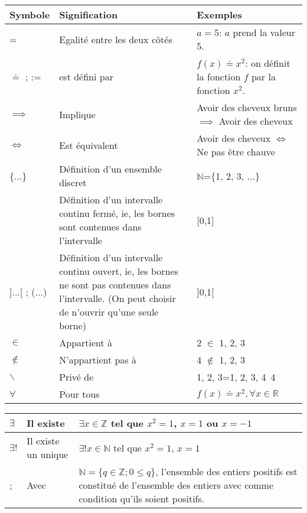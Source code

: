 \documentclass[a4paper, 12pt, french, twoside]{article}
\newcommand{\Nn}{{\mathbb{N}}}
\newcommand{\Zz}{{\mathbb{Z}}}
\newcommand{\Rr}{{\mathbb{R}}}
\begin{document}
\begin{center}
\begin{tabular}{|m{1.5cm} |m{8cm}| m{6.5cm}|} 
 \hline
 Symbole & Signification & Exemples\\ [0.5ex] 
 \hline
 = & Egalité entre les deux côtés & $a=5$: $a$ prend la valeur 5.  \\ 
 \hline
 $\doteq$ ; := & est défini par & $f(x)\doteq x^2$: on définit la fonction $f$ par la fonction $x^2$.  \\
 \hline
 $\implies$ & Implique & Avoir des cheveux bruns $\implies$ Avoir des cheveux \\
 \hline
 $\iff$ & Est équivalent & Avoir des cheveux $\iff$ Ne pas être chauve\\
 \hline
 \{...\} & Définition d'un ensemble discret & $\Nn$=\{1, 2, 3, ...\}  \\
 \hline
 [...] & Définition d'un intervalle continu fermé, ie, les bornes sont contenues dans l'intervalle & [0,1]  \\
 \hline
 ]...[ ; (...)& Définition d'un intervalle continu ouvert, ie, les bornes ne sont pas contenues dans l'intervalle. (On peut choisir de n'ouvrir qu'une seule borne) & ]0,1[  \\
 \hline
  $\in$ & Appartient à & 2 $\in$ {1, 2, 3} \\
 \hline
 $\notin$ & N'appartient pas à & 4 $\notin$ {1, 2, 3} \\
 \hline
 
 $\backslash$ & Privé de & {1, 2, 3}={1, 2, 3, 4}\ {4} \\
 \hline
 $\forall $ & Pour tous & $f(x)\doteq x^2, \forall x\in \Rr$\\
 \hline
 \end{tabular}
 \end{center}
 \begin{center}
\begin{tabular}{|m{1.5cm} |m{8cm}| m{6.5cm}|} 
 \hline
 $\exists$ & Il existe  & $\exists x \in \Zz $ tel que $x^2=1$, $x=1$ ou $x=-1$\\
 \hline
 $\exists !$ & Il existe un unique & $\exists ! x \in \Nn$ tel que $x^2=1$, $x=1$ \\
 \hline
 ;& Avec & $\Nn=\{q\in \Zz ;  0\leq q\}$, l'ensemble des entiers positifs est constitué de l'ensemble des entiers avec comme condition qu'ils soient positifs.\\
 \hline
 \end{tabular}
\end{center}
\end{document}
